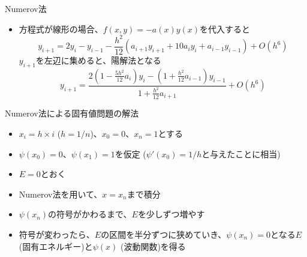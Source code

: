 \begin{frame}[t,fragile]{Numerov法}
  \begin{itemize}
    \setlength{\itemsep}{1em}
  \item 方程式が線形の場合、$f(x,y) = -a(x) y(x)$を代入すると
    \[
    y_{i+1} = 2y_i - y_{i-1} - \frac{h^2}{12} (a_{i+1}y_{i+1} + 10a_{i}y_{i} + a_{i-1}y_{i-1}) + O(h^6)
    \]
  $y_{i+1}$を左辺に集めると、陽解法となる
    \[
    y_{i+1} = \frac{2 (1-\frac{5h^2}{12} a_i)y_i - (1 + \frac{h^2}{12} a_{i-1}) y_{i-1}}{1 + \frac{h^2}{12} a_{i+1}} + O(h^6)
    \]
  \end{itemize}
\end{frame}

\begin{frame}[t,fragile]{Numerov法による固有値問題の解法}
  \begin{itemize}
    \setlength{\itemsep}{1em}
  \item $x_i=h \times i$ ($h=1/n$)、$x_0=0$、$x_n=1$とする
  \item $\psi(x_0)=0$、$\psi(x_1) = 1$を仮定 ($\psi'(x_0)=1/h$と与えたことに相当)
  \item $E = 0$とおく
  \item Numerov法を用いて、$x=x_n$まで積分
  \item $\psi(x_n)$の符号がかわるまで、$E$を少しずつ増やす
  \item 符号が変わったら、$E$の区間を半分ずつに狭めていき、$\psi(x_n)=0$となる$E$ (固有エネルギー)と$\psi(x)$ (波動関数)を得る
  \end{itemize}
\end{frame}
